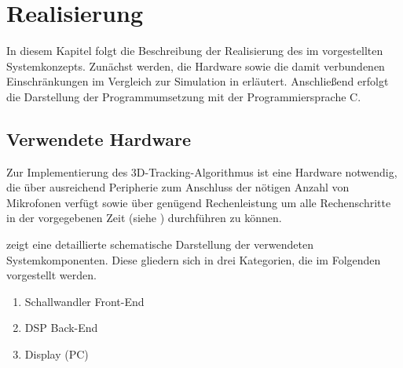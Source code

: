 \chapter{Realisierung}
\label{chap:Realisierung}
In diesem Kapitel folgt die Beschreibung der Realisierung des im  vorgestellten Systemkonzepts. Zunächst werden, die Hardware sowie die damit verbundenen Einschränkungen im Vergleich zur Simulation in \matlab erläutert. Anschließend erfolgt die Darstellung der Programmumsetzung mit der Programmiersprache C.  




\section{Verwendete Hardware}
\label{sec:VerwendeteHardware}
Zur Implementierung des 3D-Tracking-Algorithmus ist eine Hardware notwendig, die über ausreichend Peripherie zum Anschluss der nötigen Anzahl von Mikrofonen verfügt sowie über genügend Rechenleistung um alle Rechenschritte in der vorgegebenen Zeit (siehe ) durchführen zu können.

 zeigt eine detaillierte schematische Darstellung der verwendeten Systemkomponenten. Diese gliedern sich in drei Kategorien, die im Folgenden vorgestellt werden.

\begin{enumerate}
    \item Schallwandler Front-End
    \item DSP Back-End
    \item Display (PC)
\end{enumerate}


